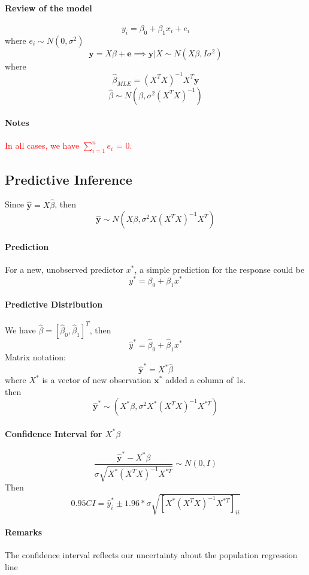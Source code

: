 \documentclass[11pt]{article}
\newcommand{\tb}[1]{\textbf{#1}}
\newcommand{\vx}[0]{\tb{x}}
\newcommand{\vy}[0]{\tb{y}}
\newcommand{\ve}[0]{\tb{e}}
\begin{document}
\paragraph{Review of the model}
$$y_i = \beta_0 + \beta_1 x_i + e_i$$ where $e_i \sim N(0, \sigma^2)$
$$\vy = X\beta + \ve \implies \vy|X \sim N(X\beta, I\sigma^2)$$
where $$\hat{\beta}_{MLE} = (X^TX)^{-1}X^T\vy$$
$$\hat{\beta} \sim N(\beta, \sigma^2(X^TX)^{-1})$$
\paragraph{Notes}
\textcolor{red}{In all cases, we have $\sum_{i=1}^n e_i$ = 0.}

\subsection{Predictive Inference}
Since $\hat{\vy} = X\hat{\beta}$, then
$$\hat{\vy} \sim N(X\beta, \sigma^2X(X^TX)^{-1}X^T)$$
\paragraph{Prediction}
For a new, unobserved predictor $x^*$, a simple prediction for the response could be $$y^* = \beta_0 + \beta_1x^*$$
\paragraph{Predictive Distribution}
We have $\hat{\beta} = [\hat{\beta}_0, \hat{\beta}_1]^T$, then
$$\hat{y}^* = \hat{\beta}_0 + \hat{\beta}_1x^*$$
Matrix notation:
$$\hat{\vy}^* = X^*\hat{\beta}$$
where $X^*$ is a vector of new observation $\vx^*$ added a column of 1s. \\
then
$$\hat{\vy}^* \sim (X^*\beta, \sigma^2X^*(X^TX)^{-1}X^{*T})$$
\paragraph{Confidence Interval for $X^*\beta$}
$$\frac{\hat{\vy}^*-X^*\beta}{\sigma\sqrt{X^*(X^TX)^{-1}X^{*T}}} \sim N(0,I)$$
Then $$0.95 CI = \hat{y}^*_i \pm 1.96 * \sigma \sqrt{[X^*(X^TX)^{-1}X^{*T}]_{ii}}$$
\paragraph{Remarks}
The confidence interval reflects our uncertainty about the population regression line
\end{document}
